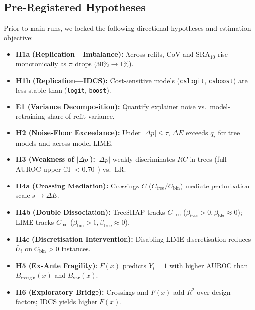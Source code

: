 \documentclass[conference]{IEEEtran}
\begin{document}
\subsection{Pre-Registered Hypotheses}
Prior to main runs, we locked the following directional hypotheses and estimation objective:
\begin{itemize}\setlength{\itemsep}{1pt}\setlength{\parskip}{0pt}\setlength{\topsep}{2pt}
    \item \textbf{H1a (Replication---Imbalance):} Across refits, $\mathrm{CoV}$ and $\mathrm{SRA}_{10}$ rise monotonically as $\pi$ drops ($30\%{\to}1\%$).
    \item \textbf{H1b (Replication---IDCS):} Cost-sensitive models (\texttt{cslogit}, \texttt{csboost}) are less stable than (\texttt{logit}, \texttt{boost}).
    \item \textbf{E1 (Variance Decomposition):} Quantify explainer noise vs.\ model-retraining share of refit variance.
    \item \textbf{H2 (Noise-Floor Exceedance):} Under $|\Delta p|{\le}\tau$, $\Delta E$ exceeds $q_i$ for tree models and across-model LIME.
    \item \textbf{H3 (Weakness of $|\Delta p|$):} $|\Delta p|$ weakly discriminates $RC$ in trees (full AUROC upper CI $<0.70$~\cite{hosmer2013}) vs.\ LR.
    \item \textbf{H4a (Crossing Mediation):} Crossings $C$ ($C_{\mathrm{tree}}/C_{\mathrm{bin}}$) mediate perturbation scale $s \to \Delta E$.
    \item \textbf{H4b (Double Dissociation):} TreeSHAP tracks $C_{\mathrm{tree}}$ ($\beta_{\mathrm{tree}}{>}0, \beta_{\mathrm{bin}}{\approx}0$); LIME tracks $C_{\mathrm{bin}}$ ($\beta_{\mathrm{bin}}{>}0, \beta_{\mathrm{tree}}{\approx}0$).
    \item \textbf{H4c (Discretisation Intervention):} Disabling LIME discretisation reduces $\bar{U}_i$ on $C_{\mathrm{bin}}{>}0$ instances.
    \item \textbf{H5 (Ex-Ante Fragility):} $F(x)$ predicts $Y_i{=}1$ with higher AUROC than $B_{\mathrm{margin}}(x)$ and $B_{\mathrm{var}}(x)$.
    \item \textbf{H6 (Exploratory Bridge):} Crossings and $F(x)$ add $R^2$ over design factors; IDCS yields higher $F(x)$.
\end{itemize}
\end{document}
